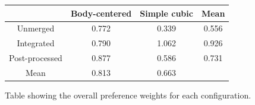 \documentclass[]{article}
\begin{document}
\FloatBarrier

\begin{figure}[htb]
\centering
\begin{tabular}{|c|c|c|c|}
\hline
 & Body-centered & Simple cubic & Mean \\ \hline
Unmerged & 0.772 & 0.339 & 0.556 \\ \hline
Integrated & 0.790 & 1.062 & 0.926 \\ \hline
Post-processed & 0.877 & 0.586 & 0.731 \\ \hline
Mean & 0.813 & 0.663 &  \\ \hline
\end{tabular}
\caption{Table showing the overall preference weights for each configuration.}
\label{fig:prefoverall}
\end{figure}

\FloatBarrier
\end{document}
